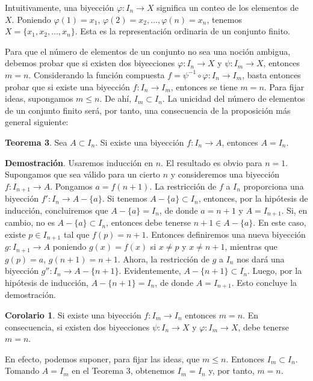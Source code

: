 Intuitivamente, una biyección \(\varphi: I_n \to X\) significa un conteo de los elementos de \(X\). Poniendo \(\varphi(1) = x_1\), \(\varphi(2) = x_2, \dots, \varphi(n) = x_n\), tenemos \(X = \{x_1, x_2, \dots, x_n\}\). Esta es la representación ordinaria de un conjunto finito.

Para que el número de elementos de un conjunto no sea una noción ambigua, debemos probar que si existen dos biyecciones \(\varphi: I_n \to X\) y \(\psi: I_m \to X\), entonces \(m = n\). Considerando la función compuesta \(f = \psi^{-1} \circ \varphi: I_n \to I_m\), basta entonces probar que si existe una biyección \(f: I_n \to I_m\), entonces se tiene \(m = n\). Para fijar ideas, supongamos \(m \le n\). De ahí, \(I_m \subset I_n\). La unicidad del número de elementos de un conjunto finito será, por tanto, una consecuencia de la proposición más general siguiente:

\textbf{Teorema 3}. Sea \(A \subset I_n\). Si existe una biyección \(f: I_n \to A\), entonces \(A = I_n\).

\textbf{Demostración}. Usaremos inducción en \(n\). El resultado es obvio para \(n = 1\). Supongamos que sea válido para un cierto \(n\) y consideremos una biyección \(f: I_{n+1} \to A\). Pongamos \(a = f(n + 1)\). La restricción de \(f\) a \(I_n\) proporciona una biyección \(f': I_n \to A - \{a\}\). Si tenemos \(A - \{a\} \subset I_n\), entonces, por la hipótesis de inducción, concluiremos que \(A - \{a\} = I_n\), de donde \(a = n + 1\) y \(A = I_{n+1}\). Si, en cambio, no es \(A - \{a\} \subset I_n\), entonces debe tenerse \(n + 1 \in A - \{a\}\). En este caso, existe \(p \in I_{n+1}\) tal que \(f(p) = n + 1\). Entonces definiremos una nueva biyección \(g: I_{n+1} \to A\) poniendo \(g(x) = f(x)\) si \(x \neq p\) y \(x \neq n + 1\), mientras que \(g(p) = a\), \(g(n + 1) = n + 1\). Ahora, la restricción de \(g\) a \(I_n\) nos dará una biyección \(g'': I_n \to A - \{n + 1\}\). Evidentemente, \(A - \{n + 1\} \subset I_n\). Luego, por la hipótesis de inducción, \(A - \{n + 1\} = I_n\), de donde \(A = I_{n+1}\). Esto concluye la demostración.

\textbf{Corolario 1}. Si existe una biyección \(f: I_m \to I_n\) entonces \(m = n\). En consecuencia, si existen dos biyecciones \(\psi: I_n \to X\) y \(\varphi: I_m \to X\), debe tenerse \(m = n\).

En efecto, podemos suponer, para fijar las ideas, que \(m \le n\). Entonces \(I_m \subset I_n\). Tomando \(A = I_m\) en el Teorema 3, obtenemos \(I_m = I_n\) y, por tanto, \(m = n\).

